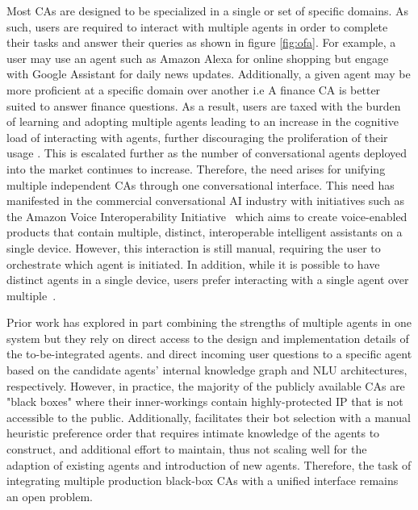 \documentclass[11pt]{article}
\begin{document}
Most CAs are designed to be specialized in a single or set of specific domains.
As such, users are required to interact with multiple agents in order to complete their tasks and answer their queries as shown in figure \ref{fig:ofa}. For example, a user may use an agent such as Amazon Alexa for online shopping but engage with Google Assistant for daily news updates. Additionally, a given agent may be more proficient at a specific domain over another i.e A finance CA is better suited to answer finance questions. As a result, users are taxed with the burden of learning and adopting multiple agents leading to an increase in the cognitive load of interacting with agents, further discouraging the proliferation of their usage \cite{dubiel2020, novick2018, choice2019}. This is escalated further as the number of conversational agents deployed into the market continues to increase.
Therefore, the need arises for unifying multiple independent CAs through one conversational interface. 
This need has manifested in the commercial conversational AI industry with initiatives such as the Amazon Voice Interoperability Initiative~\cite{amazon.com} which aims to create voice-enabled products that contain multiple, distinct, interoperable intelligent assistants on a single device.
However, this interaction is still manual, requiring the user to orchestrate which agent is initiated. In addition, while it is possible to have distinct agents in a single device, users prefer interacting with a single agent over multiple~\cite{Chaves:2018:SMC:3173574.3173765}.


Prior work has explored in part combining the strengths of multiple agents in one system but they rely on direct access to the design and implementation details of the to-be-integrated agents. \citet{Subramaniam:2018:CCM:3237383.3237472} and \citet{alanav2} direct incoming user questions to a specific agent based on the candidate agents' internal knowledge graph and NLU architectures, respectively. However, in practice, the majority of the publicly available CAs are "black boxes" where their inner-workings contain highly-protected IP that is not accessible to the public. Additionally, \citet{alanav2} facilitates their bot selection with a manual heuristic preference order that requires intimate knowledge of the agents to construct, and additional effort to maintain, thus not scaling well for the adaption of existing agents and introduction of new agents. Therefore, the task of integrating multiple production black-box CAs with a unified interface remains an open problem.
\end{document}
